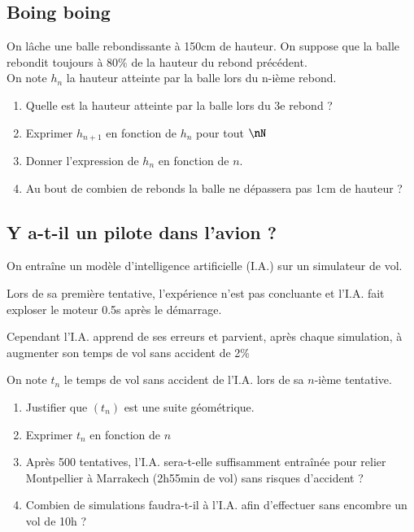 \documentclass[oneside,12pt]{article}          %
\begin{document}
\subsection{Boing boing}
On lâche une balle rebondissante à 150cm de hauteur. On suppose que la balle rebondit toujours à 80$\%$ de la hauteur du rebond précédent. \\
On note $h_{n}$ la hauteur atteinte par la balle lors du n-ième rebond.

\begin{enumerate}
    \item Quelle est la hauteur atteinte par la balle lors du 3e rebond ?
    \item Exprimer $h_{n+1}$ en fonction de $h_{n}$ pour tout $\nN$
    \item Donner l'expression de $h_{n}$ en fonction de $n$.
    \item[\faCalculator] Au bout de combien de rebonds la balle ne dépassera pas 1cm de hauteur ?
\end{enumerate}



\subsection{Y a-t-il un pilote dans l'avion ?}
On entraîne un modèle d'intelligence artificielle (I.A.) sur un simulateur de vol.

Lors de sa première tentative, l'expérience n'est pas concluante et l'I.A. fait exploser le moteur 0.5s après le démarrage.

Cependant l'I.A. apprend de ses erreurs et parvient, après chaque simulation, à augmenter son temps de vol sans accident de 2\%

On note $t_n$ le temps de vol sans accident de l'I.A. lors de sa $n$-ième tentative.

\begin{enumerate}
    \item Justifier que $(t_n)$ est une suite géométrique.
    \item Exprimer $t_n$ en fonction de $n$
    \item Après 500 tentatives, l'I.A. sera-t-elle suffisamment entraînée pour relier Montpellier à Marrakech (2h55min de vol) sans risques d'accident ?
    \item[\faCalculator] Combien de simulations faudra-t-il à l'I.A. afin d'effectuer sans encombre un vol de 10h ? 
\end{enumerate}
\end{document}

